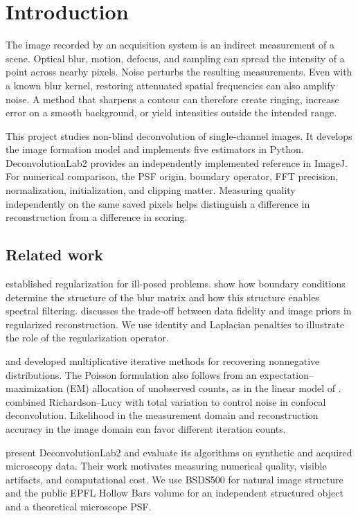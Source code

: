 \section{Introduction}
\label{sec:intro}

The image recorded by an acquisition system is an indirect measurement of a scene. Optical blur, motion, defocus, and sampling can spread the intensity of a point across nearby pixels. Noise perturbs the resulting measurements. Even with a known blur kernel, restoring attenuated spatial frequencies can also amplify noise. A method that sharpens a contour can therefore create ringing, increase error on a smooth background, or yield intensities outside the intended range.

This project studies non-blind deconvolution of single-channel images. It develops the image formation model and implements five estimators in Python. DeconvolutionLab2 provides an independently implemented reference in ImageJ. For numerical comparison, the PSF origin, boundary operator, FFT precision, normalization, initialization, and clipping matter. Measuring quality independently on the same saved pixels helps distinguish a difference in reconstruction from a difference in scoring.

\subsection{Related work}

\citet{tikhonov} established regularization for ill-posed problems. \citet{hansen} show how boundary conditions determine the structure of the blur matrix and how this structure enables spectral filtering. \citet{fessler} discusses the trade-off between data fidelity and image priors in regularized reconstruction. We use identity and Laplacian penalties to illustrate the role of the regularization operator.

\citet{richardson} and \citet{lucy} developed multiplicative iterative methods for recovering nonnegative distributions. The Poisson formulation also follows from an expectation--maximization (EM) allocation of unobserved counts, as in the linear model of \citet{shepp}. \citet{dey} combined Richardson--Lucy with total variation to control noise in confocal deconvolution. Likelihood in the measurement domain and reconstruction accuracy in the image domain can favor different iteration counts.

\citet{sage} present DeconvolutionLab2 and evaluate its algorithms on synthetic and acquired microscopy data. Their work motivates measuring numerical quality, visible artifacts, and computational cost. We use BSDS500 \citep{bsds} for natural image structure and the public EPFL Hollow Bars volume \citep{epflbars} for an independent structured object and a theoretical microscope PSF.

